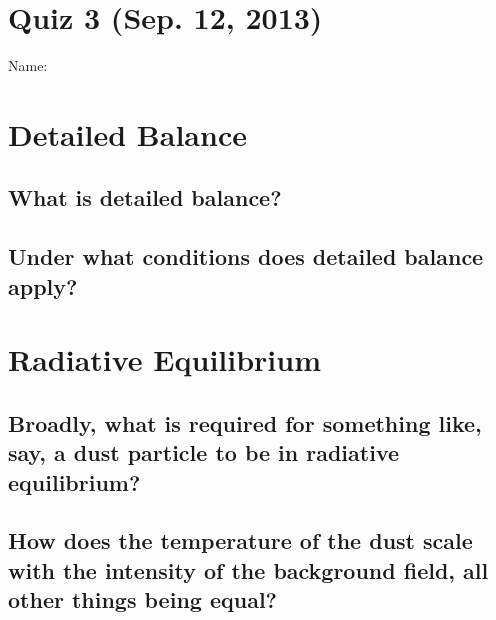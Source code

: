 \documentclass[11pt]{article}
\begin{document}
\pagestyle{empty}
\parindent=0pt

\section*{\centering Quiz 3 (Sep. 12, 2013)}

{\large
Name:\\
}

\section{Detailed Balance}
\subsection{What is detailed balance?}
\vspace{1.5in}
\subsection{Under what conditions does detailed balance apply?}
\vspace{1.5in}

\section{Radiative Equilibrium}

\subsection{Broadly, what is required for something like, say, a dust particle to be in radiative equilibrium?}
\vspace{1.5in}
\subsection{How does the temperature of the dust scale with the intensity of the background field,
all other things being equal?}
~
\vspace{1.5in}
\end{document}
